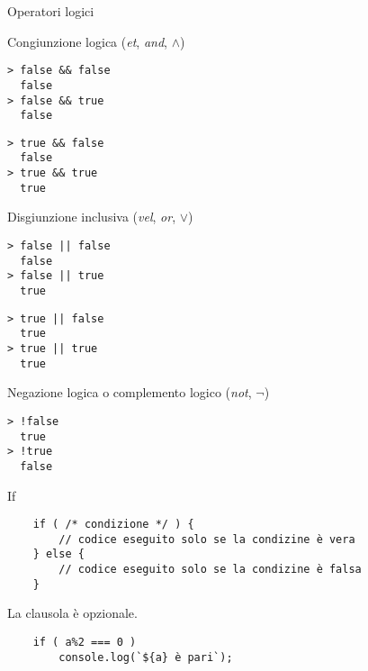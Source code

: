 \begin{frame}[fragile]{Operatori logici}\transfade\centering
  \begin{description}[<+->]
    \item[\mintjs{&&}] Congiunzione logica (\emph{et}, \emph{and}, $\land$)\\\smallskip
\begin{minipage}{.3\linewidth}
\begin{verbatim}
> false && false
  false
> false && true
  false
\end{verbatim}
\end{minipage}
\begin{minipage}{.3\linewidth}
\begin{verbatim}
> true && false
  false
> true && true
  true
\end{verbatim}
\end{minipage}\smallskip
    \item[\mintjs{||}] Disgiunzione inclusiva (\emph{vel}, \emph{or}, $\lor$)\\\smallskip
\begin{minipage}{.3\linewidth}
\begin{verbatim}
> false || false
  false
> false || true
  true
\end{verbatim}
\end{minipage}
\begin{minipage}{.3\linewidth}
\begin{verbatim}
> true || false
  true
> true || true
  true
\end{verbatim}
\end{minipage}\smallskip
    \item[\mintjs{!}] Negazione logica o complemento logico (\emph{not}, $\lnot$)\smallskip
\begin{verbatim}
> !false
  true
> !true
  false
\end{verbatim}
  \end{description}
\end{frame}

\begin{frame}[fragile]{If}\transfade\centering
  \begin{verbatim}
    if ( /* condizione */ ) {
        // codice eseguito solo se la condizine è vera
    } else {
        // codice eseguito solo se la condizine è falsa
    }
  \end{verbatim}
  \pause\bigskip
  La clausola  è opzionale.
  \begin{verbatim}
    if ( a%2 === 0 )
        console.log(`${a} è pari`);
  \end{verbatim}
\end{frame}

